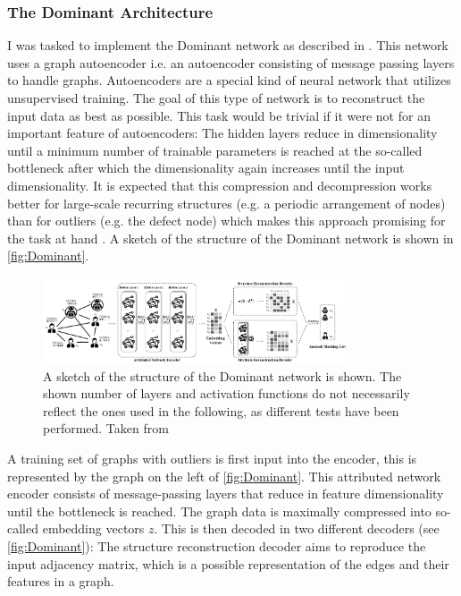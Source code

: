 \documentclass[11pt,a4paper]{article}
\begin{document}
\subsubsection{The Dominant Architecture}
I was tasked to implement the Dominant network as described in \cite{dingDeepAnomalyDetection2019}. 
This network uses a graph autoencoder i.e. an autoencoder consisting of message passing layers to handle graphs. 
Autoencoders are a special kind of neural network that utilizes unsupervised training. 
The goal of this type of network is to reconstruct the input data as best as possible. 
This task would be trivial if it were not for an important feature of autoencoders: 
The hidden layers reduce in dimensionality until a minimum number of trainable parameters is reached at the so-called bottleneck after which the dimensionality again increases until the input dimensionality. 
It is expected that this compression and decompression works better for large-scale recurring structures (e.g. a periodic arrangement of nodes) than for outliers (e.g. the defect node) which makes this approach promising for the task at hand \cite{dingDeepAnomalyDetection2019}. 
A sketch of the structure of the Dominant network is shown in \autoref{fig:Dominant}.
\begin{figure}[htbp]
\centering
\includegraphics[width=0.8\textwidth]{images/ding_1.png}
\caption{A sketch of the structure of the Dominant network is shown. The shown number of layers and activation functions do not necessarily reflect the ones used in the following, as different tests have been performed. Taken from \cite[Fig.1]{dingDeepAnomalyDetection2019}}
\label{fig:Dominant}
\end{figure}
A training set of graphs with outliers is first input into the encoder, this is represented by the graph on the left of \autoref{fig:Dominant}. 
This attributed network encoder consists of message-passing layers that reduce in feature dimensionality until the bottleneck is reached. 
The graph data is maximally compressed into so-called embedding vectors $z$. 
This is then decoded in two different decoders (see \autoref{fig:Dominant}): 
The structure reconstruction decoder aims to reproduce the input adjacency matrix, which is a possible representation of the edges and their features in a graph. 
\end{document}
